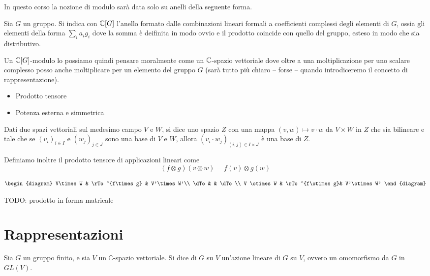 \documentclass[a4paper,10pt,oneside]{math_article}
\newcommand{\tensor}{\otimes}
\begin{document}
      In questo corso la nozione di modulo sarà data solo su anelli della seguente forma.
      \begin{mydef}
       Sia $G$ un gruppo. Si indica con $\mathbb C[G]$ l'anello formato dalle combinazioni lineari formali a coefficienti complessi degli elementi di $G$, ossia gli elementi della forma $\sum_i a_ig_i$ dove la somma è deifinita in modo ovvio e il prodotto coincide con quello del gruppo, esteso in modo che sia distributivo. 
      \end{mydef}
      
      Un $\mathbb C[G]$-modulo lo possiamo quindi pensare moralmente come un $\mathbb C$-spazio vettoriale dove oltre a una moltiplicazione per uno scalare complesso posso anche moltiplicare per un elemento del gruppo $G$ (sarà tutto più chiaro -- forse -- quando introdiceremo il concetto di rappresentazione).


    
    \begin{itemize}
     \item Prodotto tensore
     \item Potenza esterna e simmetrica
    \end{itemize}

    
    
    \begin{mydef}
     Dati due spazi vettoriali sul medesimo campo $V$ e $W$, si dice  uno spazio $Z$ con una mappa $(v,w) \mapsto v\cdot w$ da $V\times W$ in $Z$ che sia bilineare e tale che se $(v_i)_{i\in I}$ e $(w_j)_{j\in J}$ sono una base di $V$ e $W$, allora $(v_i\cdot w_j)_{(i,j)\in I\times J}$ è una base di $Z$.
    \end{mydef}
  
    Definiamo inoltre il prodotto tensore di applicazioni lineari come 
    \[
     (f \otimes g)(v\otimes w)=f(v)\otimes g(w) 
    \]
    
      \[
       \begin{diagram}
	V\times W      & \rTo^{f\times g} & V'\times W'\\
	\dTo           &           	  & \dTo \\
	V \tensor W     & \rTo^{f\tensor g}& V'\tensor W'
       \end{diagram}
      \]
   
    TODO: prodotto in forma matricale

  \section{Rappresentazioni}
    \begin{mydef}
      Sia $G$ un gruppo finito, e sia $V$ un $\mathbb C$-spazio vettoriale. Si dice  di $G$ su $V$ un'azione lineare di $G$ su $V$, ovvero un omomorfismo da $G$ in $GL(V)$.
    \end{mydef}
    
\end{document}
